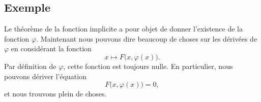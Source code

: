 \subsection{Exemple}

Le théorème de la fonction implicite a pour objet de donner l'existence de la fonction \( \varphi\). Maintenant nous pouvons dire beaucoup de choses sur les dérivées de \( \varphi\) en considérant la fonction
\begin{equation}
    x\mapsto F\big( x,\varphi(x) \big).
\end{equation}
Par définition de \( \varphi\), cette fonction est toujours nulle. En particulier, nous pouvons dériver l'équation
\begin{equation}
    F\big( x,\varphi(x) \big)=0,
\end{equation}
et nous trouvons plein de choses.

